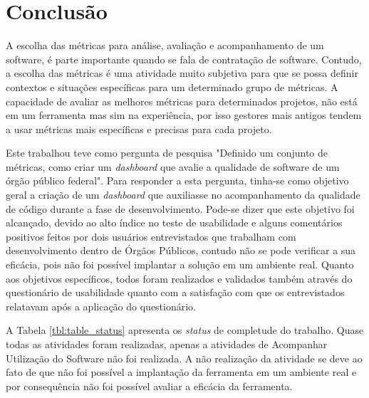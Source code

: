 \chapter[Conclusão]{Conclusão}
\label{sec:conclusão}
A escolha das métricas para análise, avaliação e acompanhamento de um software, é parte importante quando se fala de contratação de software. Contudo, a escolha das métricas é uma atividade muito subjetiva para que se possa definir contextos e situações específicas para um determinado grupo de métricas. A capacidade de avaliar as melhores métricas para determinados projetos, não está em um ferramenta mas sim na experiência, por isso gestores mais antigos tendem a usar métricas mais específicas e precisas para cada projeto. 

Este trabalhou teve como pergunta de pesquisa "Definido um conjunto de métricas, como criar um \textit{dashboard} que avalie a qualidade de software de um órgão público federal". Para responder a esta pergunta, tinha-se como objetivo geral a criação de um \textit{dashboard} que auxiliasse no acompanhamento da qualidade de código durante a fase de desenvolvimento. Pode-se dizer que este objetivo foi alcançado, devido ao alto índice no teste de usabilidade e alguns comentários positivos feitos por dois usuários entrevistados que trabalham com desenvolvimento dentro de Órgãos Públicos, contudo não se pode verificar a sua eficácia, pois não foi possível implantar a solução em um ambiente real.
Quanto aos objetivos específicos, todos foram realizados e validados também através do questionário de usabilidade quanto com a satisfação com que os entrevistados relatavam após a aplicação do questionário.

A Tabela \ref{tbl:table_status} apresenta os \textit{status} de completude do trabalho. Quase todas as atividades foram realizadas, apenas a atividades de Acompanhar Utilização do Software não foi realizada. A não realização da atividade se deve ao fato de que não foi possível a implantação da ferramenta em um ambiente real e por consequência não foi possível avaliar a eficácia da ferramenta.


